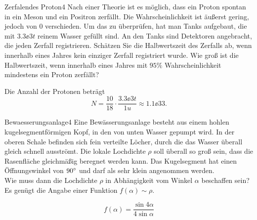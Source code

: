 \begin{problem}{Zerfalendes Proton}{4}
Nach einer Theorie ist es möglich, dass ein Proton spontan in ein Meson und ein Positron zerfällt. Die Wahrscheinlichkeit ist äußerst gering, jedoch von $0$ verschieden. Um das zu überprüfen, hat man Tanks aufgebaut, die mit $3.3\ee{3}\unit{t}$ reinem Wasser gefüllt sind. An den Tanks sind Detektoren angebracht, die jeden Zerfall registrieren. Schätzen Sie die Halbwertszeit des Zerfalls ab, wenn innerhalb eines Jahres kein einziger Zerfall registriert wurde. Wie groß ist die Halbwertszeit, wenn innerhalb eines Jahres mit $95\%$ Wahrscheinlichkeit mindestens ein Proton zerfällt?
\begin{solution}
Die Anzahl der Protonen beträgt
\[
N=\frac{10}{18}\cdot\frac{3.3\ee{3}\unit{t}}{1u}\approx 1.1\ee{33}.
\]
\end{solution}
\end{problem}


\begin{problem}{Bewaesserungsanlage}{4}
Eine Bewässerungsanlage besteht aus einem hohlen kugelsegmentförmigen Kopf, in den von unten Wasser gepumpt wird. In der oberen Schale befinden sich fein verteilte Löcher, durch die das Wasser überall gleich schnell ausströmt. Die lokale Lochdichte $\rho$ soll überall so groß sein, dass die Rasenfläche gleichmäßig beregnet werden kann. Das Kugelsegment hat einen Öffnungswinkel von $90^\circ$ und darf als sehr klein angenommen werden.\\
Wie muss dann die Lochdichte $\rho$ in Abhängigkeit vom Winkel $\alpha$ beschaffen sein? Es genügt die Angabe einer Funktion $f(\alpha)\sim\rho$.
\begin{solution}
\[
f(\alpha)=\frac{\sin{4\alpha}}{4\sin{\alpha}}
\]
\end{solution}
\end{problem}


